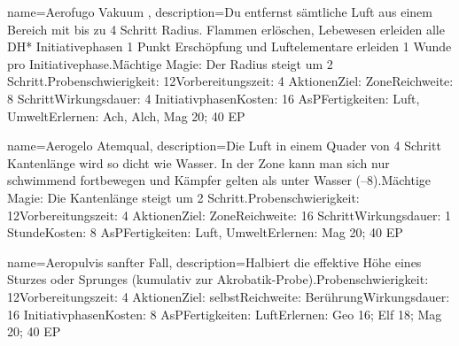 {
    name={Aerofugo Vakuum },
    description={Du entfernst sämtliche Luft aus einem Bereich mit bis zu 4 Schritt Radius. Flammen erlöschen, Lebewesen erleiden alle DH* Initiativephasen 1 Punkt Erschöpfung und Luftelementare erleiden 1 Wunde pro Initiativephase.\newline Mächtige Magie: Der Radius steigt um 2 Schritt.\newline Probenschwierigkeit: 12\newline Vorbereitungszeit: 4 Aktionen\newline Ziel: Zone\newline Reichweite: 8 Schritt\newline Wirkungsdauer: 4 Initiativphasen\newline Kosten: 16 AsP\newline Fertigkeiten: Luft, Umwelt\newline Erlernen: Ach, Alch, Mag 20; 40 EP}
}


{
    name={Aerogelo Atemqual},
    description={Die Luft in einem Quader von 4 Schritt Kantenlänge wird so dicht wie Wasser. In der Zone kann man sich nur schwimmend fortbewegen und Kämpfer gelten als unter Wasser (–8).\newline Mächtige Magie: Die Kantenlänge steigt um 2 Schritt.\newline Probenschwierigkeit: 12\newline Vorbereitungszeit: 4 Aktionen\newline Ziel: Zone\newline Reichweite: 16 Schritt\newline Wirkungsdauer: 1 Stunde\newline Kosten: 8 AsP\newline Fertigkeiten: Luft, Umwelt\newline Erlernen: Mag 20; 40 EP}
}


{
    name={Aeropulvis sanfter Fall},
    description={Halbiert die effektive Höhe eines Sturzes oder Sprunges (kumulativ zur Akrobatik-Probe).\newline Probenschwierigkeit: 12\newline Vorbereitungszeit: 4 Aktionen\newline Ziel: selbst\newline Reichweite: Berührung\newline Wirkungsdauer: 16 Initiativphasen\newline Kosten: 8 AsP\newline Fertigkeiten: Luft\newline Erlernen: Geo 16; Elf 18; Mag 20; 40 EP}
}


